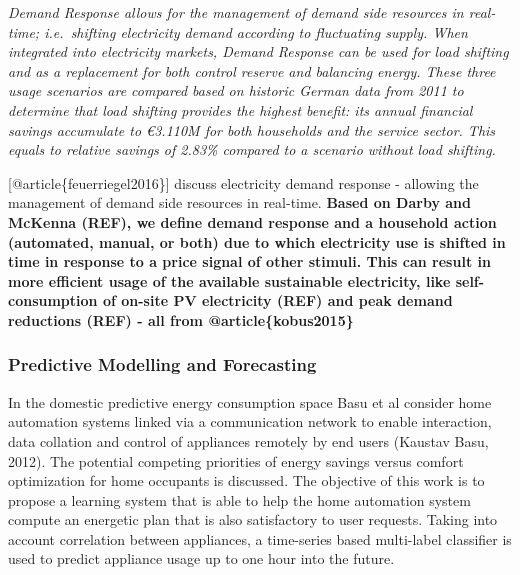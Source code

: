\documentclass[11pt,]{article}
\begin{document}
\emph{Demand Response allows for the management of demand side resources
in real-time; i.e.~shifting electricity demand according to fluctuating
supply. When integrated into electricity markets, Demand Response can be
used for load shifting and as a replacement for both control reserve and
balancing energy. These three usage scenarios are compared based on
historic German data from 2011 to determine that load shifting provides
the highest benefit: its annual financial savings accumulate to €3.110M
for both households and the service sector. This equals to relative
savings of 2.83\% compared to a scenario without load shifting.}

{[}@article\{feuerriegel2016\}{]} discuss electricity demand response -
allowing the management of demand side resources in real-time.
\textbf{Based on Darby and McKenna (REF), we define demand response and
a household action (automated, manual, or both) due to which electricity
use is shifted in time in response to a price signal of other stimuli.
This can result in more efficient usage of the available sustainable
electricity, like self-consumption of on-site PV electricity (REF) and
peak demand reductions (REF) - all from @article\{kobus2015\}}

\hypertarget{predictive-modelling-and-forecasting}{%
\subsubsection{Predictive Modelling and
Forecasting}\label{predictive-modelling-and-forecasting}}

In the domestic predictive energy consumption space Basu et al consider
home automation systems linked via a communication network to enable
interaction, data collation and control of appliances remotely by end
users (Kaustav Basu, 2012). The potential competing priorities of energy
savings versus comfort optimization for home occupants is discussed. The
objective of this work is to propose a learning system that is able to
help the home automation system compute an energetic plan that is also
satisfactory to user requests. Taking into account correlation between
appliances, a time-series based multi-label classifier is used to
predict appliance usage up to one hour into the future.
\end{document}
